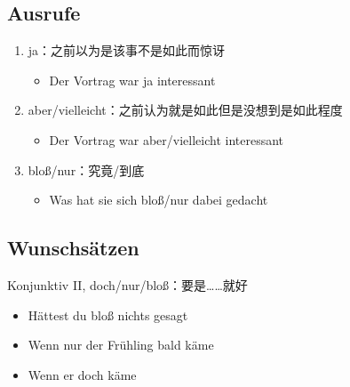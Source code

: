 \documentclass[UTF8]{report}
\begin{document}
\subsection{Ausrufe}
\begin{enumerate}
    \item ja：之前以为是该事不是如此而惊讶
    \begin{itemize}
        \item Der Vortrag war ja interessant
    \end{itemize}
    \item aber/vielleicht：之前认为就是如此但是没想到是如此程度
    \begin{itemize}
        \item Der Vortrag war aber/vielleicht interessant
    \end{itemize}
    \item bloß/nur：究竟/到底
    \begin{itemize}
        \item Was hat sie sich bloß/nur dabei gedacht
    \end{itemize}
\end{enumerate}

\subsection{Wunschsätzen}
Konjunktiv II, doch/nur/bloß：要是……就好
\begin{itemize}
    \item Hättest du bloß nichts gesagt
    \item Wenn nur der Frühling bald käme
    \item Wenn er doch käme
\end{itemize}
\end{document}

